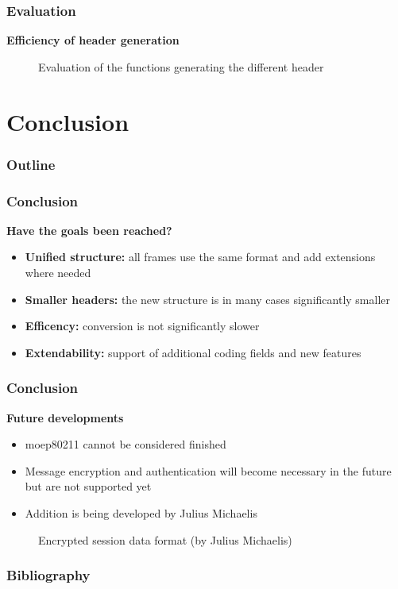 \documentclass[t]{beamer}
\begin{document}
\begin{frame}
    \frametitle{Evaluation}
    \textbf{Efficiency of header generation}

    \begin{figure}
		\centering
		\scalebox{.8}{}
		\caption{\small Evaluation of the functions generating the different header}
    \end{figure}

\end{frame}

\section{Conclusion}

\begin{frame}
    \frametitle{Outline}
    \tableofcontents[currentsection]
\end{frame}

\begin{frame}
    \frametitle{Conclusion}
    \textbf{Have the goals been reached?}

	\pause

	\begin{itemize}
		\item \textbf{Unified structure:} all frames use the same format and add extensions where needed\pause
        \item \textbf{Smaller headers:} the new structure is in many cases significantly smaller \pause
        \item \textbf{Efficency:} conversion is not significantly slower \pause
        \item \textbf{Extendability:} support of additional coding fields and new features
    \end{itemize}

\end{frame}

\begin{frame}
    \frametitle{Conclusion}
    \textbf{Future developments}

    \begin{itemize}
	
        \item moep80211 cannot be considered finished \pause
	\item Message encryption and authentication will become necessary in the future but are not supported yet\pause
        \item Addition is being developed by Julius Michaelis
    \end{itemize}
	\pause
    \begin{figure}
	
	\caption{Encrypted session data format (by Julius Michaelis)}
    \end{figure}
\end{frame}


\begin{frame}
    \frametitle{Bibliography}

	
        
        {\footnotesize
	}
	\nocite{*}
    

\end{frame}
\end{document}
